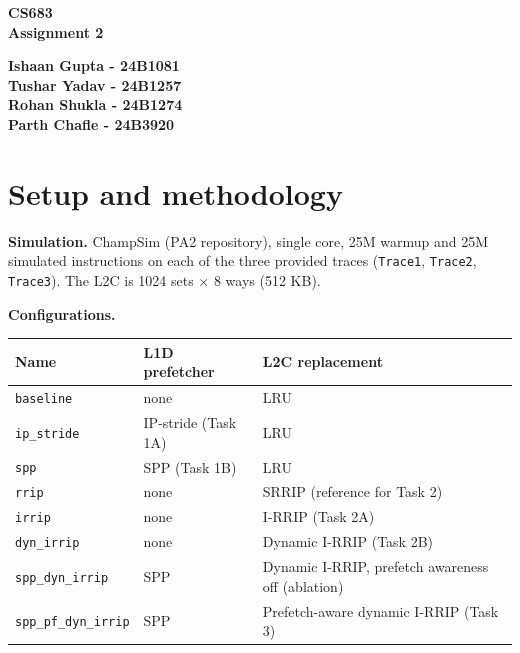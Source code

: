 \documentclass[12pt]{report}
\newcommand{\cfg}[1]{\texttt{#1}}
\begin{document}
\begin{titlepage}
\begin{center}
\vspace*{2.5cm}
\textbf{\LARGE CS683}\\[0.5em]
\vspace*{1cm}
\textbf{\LARGE Assignment 2}\\[3em]
\vspace{1cm}

\textbf{\Large Ishaan Gupta - 24B1081}\\[0.5em]
\textbf{\Large Tushar Yadav - 24B1257}\\[0.5em]
\textbf{\Large Rohan Shukla - 24B1274}\\[0.5em]
\textbf{\Large Parth Chafle - 24B3920}\\[0.5em]
\end{center}
\end{titlepage}

\tableofcontents
\newpage

\chapter{Setup and methodology}

\textbf{Simulation.} ChampSim (PA2 repository), single core, 25M warmup and
25M simulated instructions on each of the three provided traces
(\cfg{Trace1}, \cfg{Trace2}, \cfg{Trace3}). The L2C is 1024 sets
$\times$ 8 ways (512 KB).

\textbf{Configurations.}
\begin{center}
\begin{tabular}{lll}
\toprule
Name & L1D prefetcher & L2C replacement \\
\midrule
\cfg{baseline} & none & LRU \\
\cfg{ip\_stride} & IP-stride (Task 1A) & LRU \\
\cfg{spp} & SPP (Task 1B) & LRU \\
\cfg{rrip} & none & SRRIP (reference for Task 2) \\
\cfg{irrip} & none & I-RRIP (Task 2A) \\
\cfg{dyn\_irrip} & none & Dynamic I-RRIP (Task 2B) \\
\cfg{spp\_dyn\_irrip} & SPP & Dynamic I-RRIP, prefetch awareness off (ablation) \\
\cfg{spp\_pf\_dyn\_irrip} & SPP & Prefetch-aware dynamic I-RRIP (Task 3) \\
\bottomrule
\end{tabular}
\end{center}
\end{document}
